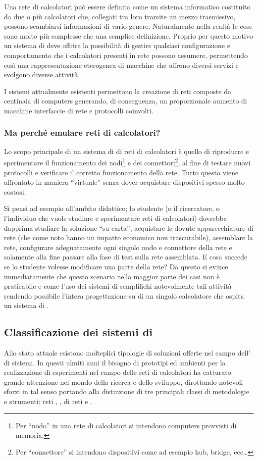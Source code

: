 Una rete di calcolatori può essere definita come un sistema informatico costituito da due o più calcolatori che, collegati tra loro tramite un mezzo trasmissivo, possono scambiarsi informazioni di vario genere. Naturalmente nella realtà le cose sono molto più complesse che una semplice definizione. Proprio per questo motivo un sistema di \emulazione{} deve offrire la possibilità di gestire qualsiasi configurazione e comportamento che i calcolatori presenti in rete possono assumere, permettendo così una rappresentazione eterogenea di macchine che offrono diversi servizi e svolgono diverse attività.

I sistemi attualmente esistenti permettono la creazione di reti composte da centinaia di computers generando, di conseguenza, un proporzionale aumento di macchine interfaccie di rete e protocolli coinvolti.

\subsubsection{Ma perché emulare reti di calcolatori?}
Lo scopo principale di un sistema di \emulazione{} di reti di calcolatori è quello di riprodurre e sperimentare il funzionamento dei nodi\footnote{Per ``nodo'' in una rete di calcolatori si intendono computers provvisti di memoria.} e dei connettori\footnote{Per ``connettore'' si intendono dispositivi come ad esempio hub, bridge, ecc\ldots}, al fine di testare nuovi protocolli e verificare il corretto funzionamento della rete. Tutto questo viene affrontato in maniera ``virtuale'' senza dover acquistare dispositivi spesso molto costosi.

Si pensi ad esempio all'ambito didattico; lo studente (o il ricercatore, o l'individuo che vuole studiare e sperimentare reti di calcolatori) dovrebbe dapprima studiare la soluzione ``su carta'', acquistare le dovute apparecchiature di rete (che come noto hanno un impatto economico non trascurabile), assemblare la rete, configurare adeguatamente ogni singolo nodo e connettore della rete e solamente alla fine passare alla fase di test sulla rete assemblata. E cosa succede se lo studente volesse modificare una parte della rete? Da questo si evince immediatamente che questo scenario nella maggior parte dei casi non è praticabile e come l'uso dei sistemi di \emulazione{} semplifichi notevolmente tali attività rendendo possibile l'intera progettazione su di un singolo calcolatore che ospita un sistema di \emulazione{}.


\subsection{Classificazione dei sistemi di \emulazione{}}
Allo stato attuale esistono molteplici tipologie di soluzioni offerte nel campo dell'\emulazione{} di sistemi. In questi ulmiti anni il bisogno di prototipi ed ambienti per la realizzazione di esperimenti nel campo delle reti di calcolatori ha catturato grande attenzione nel mondo della ricerca e dello sviluppo, dirottando notevoli sforzi in tal senso portando alla distinzione di tre principali classi di metodologie e strumenti: reti \testbed{}, \simulazione{}, \emulazione{} di reti e \virtualmachine.

